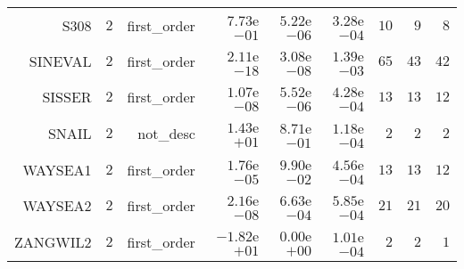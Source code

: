 \begin{longtable}{rrrrrrrrr}
S308 & \(     2\) & first\_order & \( 7.73\)e\(-01\) & \( 5.22\)e\(-06\) & \( 3.28\)e\(-04\) & \(    10\) & \(     9\) & \(     8\) \\
SINEVAL & \(     2\) & first\_order & \( 2.11\)e\(-18\) & \( 3.08\)e\(-08\) & \( 1.39\)e\(-03\) & \(    65\) & \(    43\) & \(    42\) \\
SISSER & \(     2\) & first\_order & \( 1.07\)e\(-08\) & \( 5.52\)e\(-06\) & \( 4.28\)e\(-04\) & \(    13\) & \(    13\) & \(    12\) \\
SNAIL & \(     2\) & not\_desc & \( 1.43\)e\(+01\) & \( 8.71\)e\(-01\) & \( 1.18\)e\(-04\) & \(     2\) & \(     2\) & \(     2\) \\
WAYSEA1 & \(     2\) & first\_order & \( 1.76\)e\(-05\) & \( 9.90\)e\(-02\) & \( 4.56\)e\(-04\) & \(    13\) & \(    13\) & \(    12\) \\
WAYSEA2 & \(     2\) & first\_order & \( 2.16\)e\(-08\) & \( 6.63\)e\(-04\) & \( 5.85\)e\(-04\) & \(    21\) & \(    21\) & \(    20\) \\
ZANGWIL2 & \(     2\) & first\_order & \(-1.82\)e\(+01\) & \( 0.00\)e\(+00\) & \( 1.01\)e\(-04\) & \(     2\) & \(     2\) & \(     1\) \\\hline
\end{longtable}
